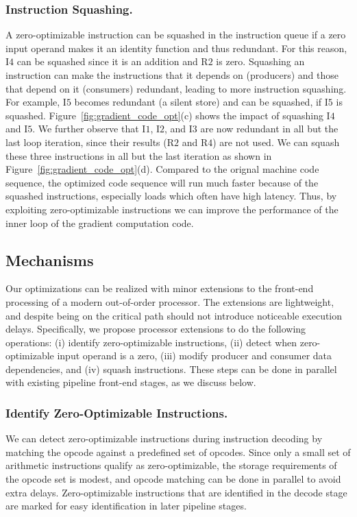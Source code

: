 \subsubsection{Instruction Squashing.} A zero-optimizable instruction can be squashed in the instruction queue if a zero input operand makes it an identity function and thus redundant. For this reason, I$4$ can be squashed since it is an addition and R$2$ is zero. Squashing an instruction can make the  instructions that it depends on (producers) and those that depend on it (consumers) redundant, leading to more instruction squashing.  For example, I$5$ becomes redundant (a silent store) and can be squashed, if I$5$ is squashed. Figure~\ref{fig:gradient_code_opt}(c) shows the impact of squashing I$4$ and I$5$.  We further observe that  I$1$, I$2$, and I$3$ are now redundant in all but the last loop iteration, since their results (R$2$ and R$4$) are not used.  We can squash these three instructions in all but the last iteration as shown in Figure~\ref{fig:gradient_code_opt}(d). Compared to the orignal machine code sequence, the optimized code sequence will run much faster because of the squashed instructions, especially loads which often have high latency.  Thus, by exploiting zero-optimizable instructions we can improve the performance of the inner loop of the gradient computation code. 

\subsection{Mechanisms}
Our optimizations can be realized with minor extensions to the front-end processing of a modern out-of-order processor. The extensions are lightweight, and despite being on the critical path should not introduce noticeable execution delays. Specifically, we propose processor extensions to do the following operations: (i) identify zero-optimizable instructions, (ii) detect when zero-optimizable input operand is a zero, (iii) modify producer and consumer data dependencies, and (iv) squash instructions.  These steps can be done in parallel with existing pipeline front-end stages, as we discuss below. 

\subsubsection{Identify Zero-Optimizable Instructions.} We can detect zero-optimizable instructions during instruction decoding by matching the opcode against a predefined set of opcodes. Since only a small set of arithmetic instructions qualify as zero-optimizable, the storage requirements of the opcode set is modest, and opcode matching can be done in parallel to avoid extra delays. Zero-optimizable instructions that are identified in the decode stage are marked for easy identification in later pipeline stages. 

